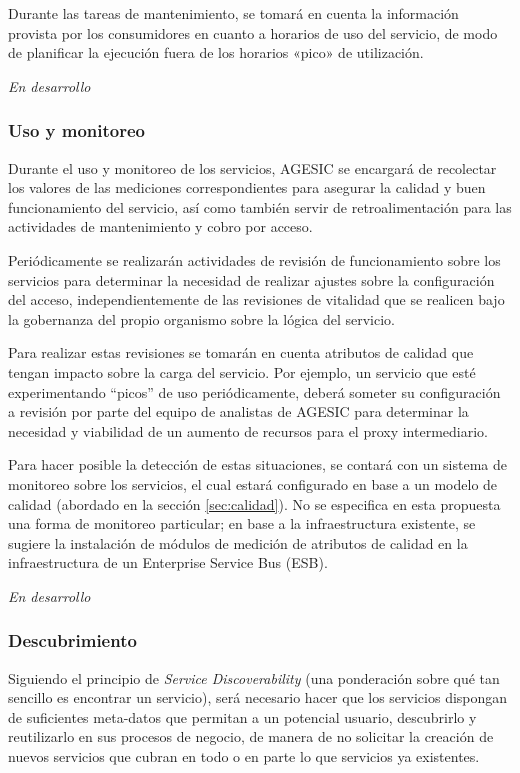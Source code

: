 \documentclass[11pt]{article}
\begin{document}
				Durante las tareas de mantenimiento, se tomará en cuenta la información provista por los consumidores en cuanto a horarios de uso del servicio, de modo de planificar la ejecución fuera de los horarios «pico» de utilización.

				\emph{En desarrollo}

			\subsubsection{Uso y monitoreo}
				Durante el uso y monitoreo de los servicios, AGESIC se encargará de recolectar los valores de las mediciones correspondientes para asegurar la calidad y buen funcionamiento del servicio, así como también servir de retroalimentación para las actividades de mantenimiento y cobro por acceso.

				Periódicamente se realizarán actividades de revisión de funcionamiento sobre los servicios para determinar la necesidad de realizar ajustes sobre la configuración del acceso, independientemente de las revisiones de vitalidad que se realicen bajo la gobernanza del propio organismo sobre la lógica del servicio.

				Para realizar estas revisiones se tomarán en cuenta atributos de calidad que tengan impacto sobre la carga del servicio. Por ejemplo, un servicio que esté experimentando ``picos'' de uso periódicamente, deberá someter su configuración a revisión por parte del equipo de analistas de AGESIC para determinar la necesidad y viabilidad de un aumento de recursos para el proxy intermediario.

				Para hacer posible la detección de estas situaciones, se contará con un sistema de monitoreo sobre los servicios, el cual estará configurado en base a un modelo de calidad (abordado en la sección \ref{sec:calidad}). No se especifica en esta propuesta una forma de monitoreo particular; en base a la infraestructura existente, se sugiere la instalación de módulos de medición de atributos de calidad en la infraestructura de un Enterprise Service Bus (ESB).

				\emph{En desarrollo}

			\subsubsection{Descubrimiento}
				Siguiendo el principio de \emph{Service Discoverability} (una ponderación sobre qué tan sencillo es encontrar un servicio), será necesario hacer que los servicios dispongan de suficientes meta-datos que permitan a un potencial usuario, descubrirlo y reutilizarlo en sus procesos de negocio, de manera de no solicitar la creación de nuevos servicios que cubran en todo o en parte lo que servicios ya existentes.
\end{document}
